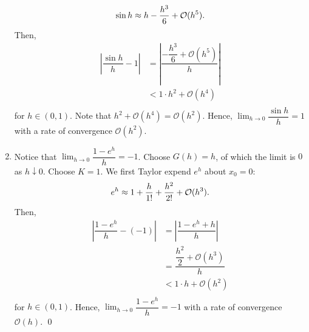 \documentclass[11pt]{article}
\theoremstyle{break}
\numberwithin{equation}{theorem}
\begin{document}
\begin{enumerate}
    \begin{equation*}
        \sin h\approx h-\dfrac{h^3}{6}+\mathcal{O}(h^5). \vspace{-0.6em}
    \end{equation*}
    Then, \vspace{-0.6em}
    \begin{align*}
        \left\lvert \dfrac{\sin h}{h}-1\right\rvert&=\left\lvert \dfrac{-\dfrac{h^3}{6}+\mathcal{O}(h^5)}{h}\right\rvert\\
        &<1\cdot h^2+\mathcal{O}(h^4)\\[-3.4em]
    \end{align*}
    for $h\in(0, 1)$. Note that $h^2+\mathcal{O}(h^4)=\mathcal{O}(h^2)$. Hence, $\displaystyle\lim_{h\to 0}\dfrac{\sin h}{h}=1$ with a rate of convergence $\mathcal{O}(h^2)$.
    \item Notice that $\displaystyle\lim_{h\to 0}\dfrac{1-e^h}{h}=-1$. Choose $G(h)=h$, of which the limit is $0$ as $h\downarrow 0$. Choose $K=1$. We first Taylor expend $e^h$ about $x_0=0$: \vspace{-0.6em}
    \begin{equation*}
        e^h\approx1+\dfrac{h}{1!}+\dfrac{h^2}{2!}+\mathcal{O}(h^3). \vspace{-0.6em}
    \end{equation*}
    Then, \vspace{-0.6em}
    \begin{align*}
        \left\lvert \dfrac{1-e^h}{h}-(-1)\right\rvert&=\left\lvert \dfrac{1-e^h+h}{h}\right\rvert\\
        &=\dfrac{\dfrac{h^2}{2}+\mathcal{O}(h^3)}{h}\\
        &<1\cdot h+\mathcal{O}(h^2)\\[-3.4em]
    \end{align*}
    for $h\in(0, 1)$. Hence, $\displaystyle\lim_{h\to 0}\dfrac{1-e^h}{h}=-1$ with a rate of convergence $\mathcal{O}(h)$. \qed
\end{enumerate}
\end{document}
